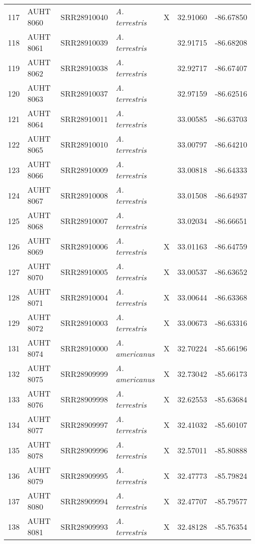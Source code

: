 \begin{longtable}{ lllllll }
117 & AUHT 8060 & SRR28910040 & \textit{A. terrestris} & X & 32.91060 & -86.67850 \\ 
118 & AUHT 8061 & SRR28910039 & \textit{A. terrestris} &  & 32.91715 & -86.68208 \\ 
119 & AUHT 8062 & SRR28910038 & \textit{A. terrestris} &  & 32.92717 & -86.67407 \\ 
120 & AUHT 8063 & SRR28910037 & \textit{A. terrestris} &  & 32.97159 & -86.62516 \\ 
121 & AUHT 8064 & SRR28910011 & \textit{A. terrestris} &  & 33.00585 & -86.63703 \\ 
122 & AUHT 8065 & SRR28910010 & \textit{A. terrestris} &  & 33.00797 & -86.64210 \\ 
123 & AUHT 8066 & SRR28910009 & \textit{A. terrestris} &  & 33.00818 & -86.64333 \\ 
124 & AUHT 8067 & SRR28910008 & \textit{A. terrestris} &  & 33.01508 & -86.64937 \\ 
125 & AUHT 8068 & SRR28910007 & \textit{A. terrestris} &  & 33.02034 & -86.66651 \\ 
126 & AUHT 8069 & SRR28910006 & \textit{A. terrestris} & X & 33.01163 & -86.64759 \\ 
127 & AUHT 8070 & SRR28910005 & \textit{A. terrestris} & X & 33.00537 & -86.63652 \\ 
128 & AUHT 8071 & SRR28910004 & \textit{A. terrestris} & X & 33.00644 & -86.63368 \\ 
129 & AUHT 8072 & SRR28910003 & \textit{A. terrestris} & X & 33.00673 & -86.63316 \\ 
131 & AUHT 8074 & SRR28910000 & \textit{A. americanus} & X & 32.70224 & -85.66196 \\ 
132 & AUHT 8075 & SRR28909999 & \textit{A. americanus} & X & 32.73042 & -85.66173 \\ 
133 & AUHT 8076 & SRR28909998 & \textit{A. terrestris} & X & 32.62553 & -85.63684 \\ 
134 & AUHT 8077 & SRR28909997 & \textit{A. terrestris} & X & 32.41032 & -85.60107 \\ 
135 & AUHT 8078 & SRR28909996 & \textit{A. terrestris} & X & 32.57011 & -85.80888 \\ 
136 & AUHT 8079 & SRR28909995 & \textit{A. terrestris} & X & 32.47773 & -85.79824 \\ 
137 & AUHT 8080 & SRR28909994 & \textit{A. terrestris} & X & 32.47707 & -85.79577 \\ 
138 & AUHT 8081 & SRR28909993 & \textit{A. terrestris} & X & 32.48128 & -85.76354 \\ 

\end{longtable}
